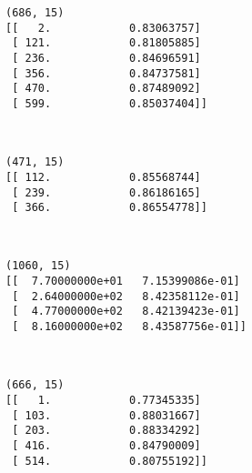 \documentclass{article}
\begin{document}
    \begin{Verbatim}[commandchars=\\\{\}]
(686, 15)
[[   2.            0.83063757]
 [ 121.            0.81805885]
 [ 236.            0.84696591]
 [ 356.            0.84737581]
 [ 470.            0.87489092]
 [ 599.            0.85037404]]
    \end{Verbatim}

    \begin{center}
    \end{center}
    { \hspace*{\fill} \\}
    
    \begin{Verbatim}[commandchars=\\\{\}]
(471, 15)
[[ 112.            0.85568744]
 [ 239.            0.86186165]
 [ 366.            0.86554778]]
    \end{Verbatim}

    \begin{center}
    \end{center}
    { \hspace*{\fill} \\}
    
    \begin{Verbatim}[commandchars=\\\{\}]
(1060, 15)
[[  7.70000000e+01   7.15399086e-01]
 [  2.64000000e+02   8.42358112e-01]
 [  4.77000000e+02   8.42139423e-01]
 [  8.16000000e+02   8.43587756e-01]]
    \end{Verbatim}

    \begin{center}
    \end{center}
    { \hspace*{\fill} \\}
    
    \begin{Verbatim}[commandchars=\\\{\}]
(666, 15)
[[   1.            0.77345335]
 [ 103.            0.88031667]
 [ 203.            0.88334292]
 [ 416.            0.84790009]
 [ 514.            0.80755192]]
    \end{Verbatim}
\end{document}
